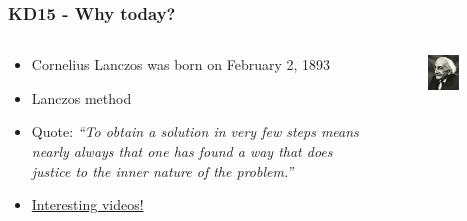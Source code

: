 \documentclass{beamer}
\begin{document}
\begin{frame}
\frametitle{KD15 - Why today?}
 \begin{columns}
 \begin{column}{0.6\textwidth}
 \begin{itemize}
  \item Cornelius Lanczos was born on February 2, 1893
  \item Lanczos method
  \item Quote: \textit{``To obtain a solution in very few steps means nearly always that one has found a way that does justice to the inner nature of the problem.''}
  \pause
  \item \href{http://guettel.com/lanczos/}{{\color{red} Interesting videos!}}
 \end{itemize}

 \end{column}

 \begin{column}{0.4\textwidth}
  \begin{figure}[t]
  \includegraphics[width=0.7\textwidth]{pics/Lanczos240.jpg}
  \end{figure}
 \end{column}
 \end{columns}
\end{frame}
\end{document}
